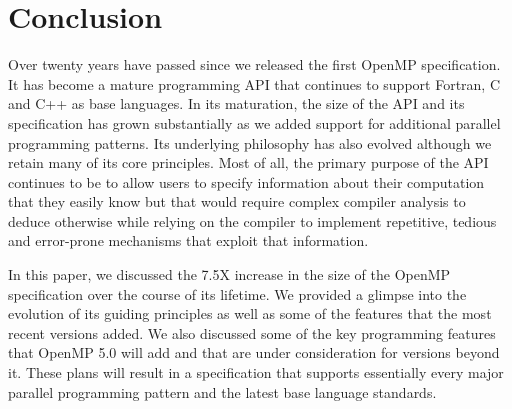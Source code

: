 \section{Conclusion}
\label{sec:conclusion}

Over twenty years have passed since we released the first OpenMP 
specification. It has become a mature programming API that 
continues to support Fortran, C and C++ as base languages. In its
maturation, the size of the API and its specification has grown 
substantially as we added support for additional parallel programming
patterns. Its underlying philosophy has also evolved although we 
retain many of its core principles. Most of all, the primary purpose 
of the API continues to be to allow users to specify information about
their computation that they easily know but that would require complex
compiler analysis to deduce otherwise while relying on the compiler
to implement repetitive, tedious and error-prone mechanisms that
exploit that information.

In this paper, we discussed the 7.5X increase in the size of the 
OpenMP specification over the course of its lifetime. We provided 
a glimpse into the evolution of its guiding principles as well as
some of the features that the most recent versions added. We also
discussed some of the key programming features that OpenMP 5.0 will
add and that are under consideration for versions beyond it. These
plans will result in a specification that supports essentially every 
major parallel programming pattern and the latest base language standards.


